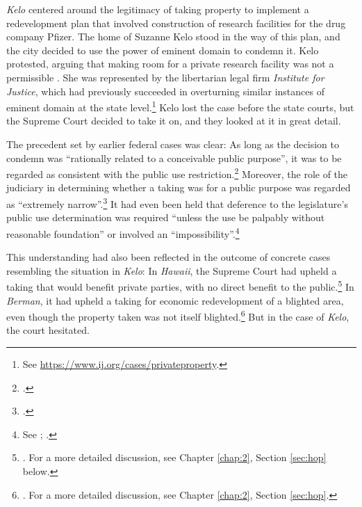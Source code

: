{\it Kelo} centered around the legitimacy of taking property to implement a redevelopment plan that involved construction of research facilities for the drug company Pfizer. The home of Suzanne Kelo stood in the way of this plan, and the city decided to use the power of eminent domain to condemn it. Kelo protested, arguing that making room for a private research facility was not a permissible  . She was represented by the libertarian legal firm {\it Institute for Justice}, which had previously succeeded in overturning similar instances of eminent domain at the state level.\footnote{See \url{https://www.ij.org/cases/privateproperty}.} Kelo lost the case before the state courts, but the Supreme Court decided to take it on, and they looked at it in great detail.

The precedent set by earlier federal cases was clear: As long as the decision to condemn was ``rationally related to a conceivable public purpose'', it was to be regarded as consistent with the public use restriction.\footcite[241]{midkiff84} Moreover, the role of the judiciary in determining whether a taking was for a public purpose was regarded as ``extremely narrow''.\footcite[32]{berman54} It had even been held that deference to the legislature's public use determination was required ``unless the use be palpably without reasonable foundation'' or involved an ``impossibility''.\footnote{See \cite[66]{dominion25}; \cite[680]{gettysburg96}.}

This understanding had also been reflected in the outcome of concrete cases resembling the situation in {\it Kelo}: In {\it Hawaii}, the Supreme Court had upheld a taking that would benefit private parties, with no direct benefit to the public.\footnote{\cite{midkiff84}. For a more detailed discussion, see Chapter \ref{chap:2}, Section \ref{sec:hop} below.} In {\it Berman}, it had upheld a taking for economic redevelopment of a blighted area, even though the property taken was not itself blighted.\footnote{\cite{berman54}. For a more detailed discussion, see Chapter \ref{chap:2}, Section \ref{sec:hop}.} But in the case of {\it Kelo}, the court hesitated.

